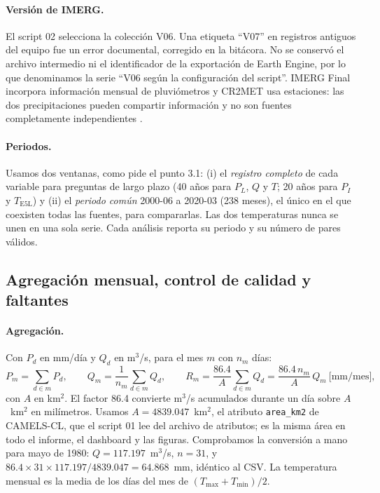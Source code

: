 \documentclass[11pt,a4paper]{article}
\newcommand{\PL}{P_L}
\newcommand{\PI}{P_I}
\newcommand{\Qm}{Q}
\begin{document}
\paragraph{Versión de IMERG.} El script 02 selecciona la colección V06. Una etiqueta ``V07'' en registros antiguos del equipo fue un error documental, corregido en la bitácora. No se conservó el archivo intermedio ni el identificador de la exportación de Earth Engine, por lo que denominamos la serie ``V06 según la configuración del script''. IMERG Final incorpora información mensual de pluviómetros y CR2MET usa estaciones: las dos precipitaciones pueden compartir información y no son fuentes completamente independientes \citep{Huffman2020,AlvarezGarreton2018}.

\paragraph{Periodos.} Usamos dos ventanas, como pide el punto 3.1: (i) el \emph{registro completo} de cada variable para preguntas de largo plazo (40 años para $\PL$, $\Qm$ y $T$; 20 años para $\PI$ y $T_{\mathrm{E5L}}$) y (ii) el \emph{periodo común} 2000-06 a 2020-03 (238 meses), el único en el que coexisten todas las fuentes, para compararlas. Las dos temperaturas nunca se unen en una sola serie. Cada análisis reporta su periodo y su número de pares válidos.

\subsection{Agregación mensual, control de calidad y faltantes}
\label{sec:qc}

\paragraph{Agregación.} Con $P_d$ en mm/día y $Q_d$ en m$^3$/s, para el mes $m$ con $n_m$ días:
\begin{equation}
P_m=\sum_{d\in m}P_d,\qquad Q_m=\frac{1}{n_m}\sum_{d\in m}Q_d,\qquad R_m=\frac{86.4}{A}\sum_{d\in m}Q_d=\frac{86.4\,n_m}{A}\,Q_m\ \text{[mm/mes]},
\label{eq:agregacion}
\end{equation}
con $A$ en km$^2$. El factor 86.4 convierte m$^3$/s acumulados durante un día sobre $A$~km$^2$ en milímetros. Usamos $A=4839.047$~km$^2$, el atributo \texttt{area\_km2} de CAMELS-CL, que el script 01 lee del archivo de atributos; es la misma área en todo el informe, el dashboard y las figuras. Comprobamos la conversión a mano para mayo de 1980: $\Qm=117.197$~m$^3$/s, $n=31$, y $86.4\times31\times117.197/4839.047=64.868$~mm, idéntico al CSV. La temperatura mensual es la media de los días del mes de $(T_{\max}+T_{\min})/2$.
\end{document}
